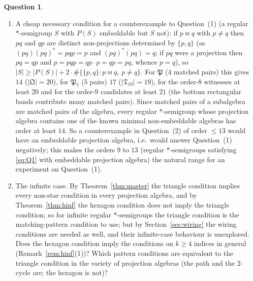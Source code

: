 \documentclass[11pt]{amsart}
\theoremstyle{definition}
\newtheorem{question}[theorem]{Question}
\newcommand{\mt}{\bowtie}   %
\begin{document}
\begin{question}
\begin{enumerate}[label=\textup{(\arabic*)}]
\item A cheap necessary condition for a counterexample to Question~(1) (a regular $*$-semigroup $S$ with $P(S)$ embeddable but $S$ not): if $p\mt q$ with $p\ne q$ then $pq$ and $qp$ are distinct non-projections determined by $\{p,q\}$ (as $(pq)(pq)^*=pqp=p$ and $(pq)^*(pq)=q$; if $pq$ were a projection then $pq=qp$ and $p=pqp=qp\cdot p=qp=pq$, whence $p=q$), so $|S|\ge|P(S)|+2\cdot\#\{\{p,q\}:p\mt q,\ p\ne q\}$. For $\mathfrak P$ ($4$ matched pairs) this gives $14$ ($|\mathfrak Q|=20$), for $\mathfrak P_7$ ($5$ pairs) $17$ ($|\mathfrak T_{19}|=19$), for the order-$8$ witnesses at least $20$ and for the order-$9$ candidates at least $21$ (the bottom rectangular bands contribute many matched pairs). Since matched pairs of a subalgebra are matched pairs of the algebra, every regular $*$-semigroup whose projection algebra contains one of the known minimal non-embeddable algebras has order at least $14$. So a counterexample in Question~(2) of order $\le13$ would have an embeddable projection algebra, i.e.\ would answer Question~(1) negatively; this makes the orders $9$ to $13$ (regular $*$-semigroups satisfying \eqref{eq:Q1} with embeddable projection algebra) the natural range for an experiment on Question~(1).
\item The infinite case. By Theorem~\ref{thm:master} the triangle condition implies every non-star condition in every projection algebra, and by Theorem~\ref{thm:hinf} the hexagon condition does not imply the triangle condition; so for infinite regular $*$-semigroups the triangle condition is the matching-pattern condition to use; but by Section~\ref{sec:wiring} the wiring conditions are needed as well, and their infinite-case behaviour is unexplored. Does the hexagon condition imply the conditions on $k\ge4$ indices in general (Remark~\ref{rem:hinf}(1))? Which pattern conditions are equivalent to the triangle condition in the variety of projection algebras (the path and the $2$-cycle are; the hexagon is not)?
\end{enumerate}
\end{question}
\end{document}
